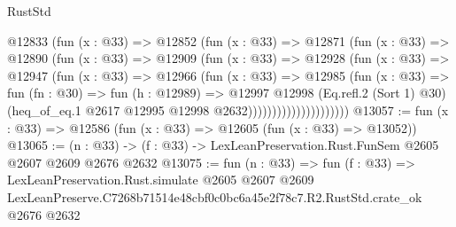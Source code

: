 \begin{lexlean}{RustStd}
\begin{coremodule}
                        @12833
                          (fun (x : @33) =>
                          @12852
                            (fun (x : @33) =>
                            @12871
                              (fun (x : @33) =>
                              @12890
                                (fun (x : @33) =>
                                @12909
                                  (fun (x : @33) =>
                                  @12928
                                    (fun (x : @33) =>
                                    @12947
                                      (fun (x : @33) =>
                                      @12966
                                        (fun (x : @33) =>
                                        @12985
                                          (fun (x : @33) =>
                                          fun (fn : @30) =>
                                          fun (h : @12989) =>
                                          @12997
                                            @12998
                                            (Eq.refl.{2} (Sort 1) @30)
                                            (heq_of_eq.{1}
                                              @2617
                                              @12995
                                              @12998
                                              @2632)))))))))))))))))))))
@13057 := fun (x : @33) => @12586 (fun (x : @33) => @12605 (fun (x : @33) => @13052))
@13065 := (n : @33) -> (f : @33) -> LexLeanPreservation.Rust.FunSem @2605 @2607 @2609 @2676 @2632
@13075 := fun (n : @33) =>
  fun (f : @33) =>
  LexLeanPreservation.Rust.simulate
    @2605
    @2607
    @2609
    LexLeanPreserve.C7268b71514e48cbf0c0bc6a45e2f78c7.R2.RustStd.crate_ok
    @2676
    @2632
\end{coremodule}
\end{lexlean}
